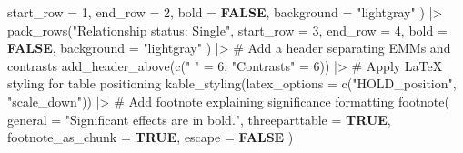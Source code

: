 \documentclass[
  bookmarksnumbered]{article}
\newenvironment{Shaded}{\begin{snugshade}}{\end{snugshade}}
\newcommand{\AttributeTok}[1]{\textcolor[rgb]{0.80,0.80,0.80}{#1}}
\newcommand{\CommentTok}[1]{\textcolor[rgb]{0.50,0.62,0.50}{#1}}
\newcommand{\ConstantTok}[1]{\textcolor[rgb]{0.86,0.64,0.64}{\textbf{#1}}}
\newcommand{\DecValTok}[1]{\textcolor[rgb]{0.86,0.86,0.80}{#1}}
\newcommand{\FunctionTok}[1]{\textcolor[rgb]{0.94,0.94,0.56}{#1}}
\newcommand{\NormalTok}[1]{\textcolor[rgb]{0.80,0.80,0.80}{#1}}
\newcommand{\OtherTok}[1]{\textcolor[rgb]{0.94,0.94,0.56}{#1}}
\newcommand{\SpecialCharTok}[1]{\textcolor[rgb]{0.86,0.64,0.64}{#1}}
\newcommand{\StringTok}[1]{\textcolor[rgb]{0.80,0.58,0.58}{#1}}
\begin{document}
\begin{Shaded}
\begin{Highlighting}[]
    \AttributeTok{start\_row =} \DecValTok{1}\NormalTok{, }\AttributeTok{end\_row =} \DecValTok{2}\NormalTok{,}
    \AttributeTok{bold =} \ConstantTok{FALSE}\NormalTok{, }\AttributeTok{background =} \StringTok{"lightgray"}
\NormalTok{  ) }\SpecialCharTok{|\textgreater{}}
  \FunctionTok{pack\_rows}\NormalTok{(}\StringTok{"Relationship status: Single"}\NormalTok{,}
    \AttributeTok{start\_row =} \DecValTok{3}\NormalTok{, }\AttributeTok{end\_row =} \DecValTok{4}\NormalTok{,}
    \AttributeTok{bold =} \ConstantTok{FALSE}\NormalTok{, }\AttributeTok{background =} \StringTok{"lightgray"}
\NormalTok{  ) }\SpecialCharTok{|\textgreater{}}
  \CommentTok{\# Add a header separating EMMs and contrasts}
  \FunctionTok{add\_header\_above}\NormalTok{(}\FunctionTok{c}\NormalTok{(}\StringTok{" "} \OtherTok{=} \DecValTok{6}\NormalTok{, }\StringTok{"Contrasts"} \OtherTok{=} \DecValTok{6}\NormalTok{)) }\SpecialCharTok{|\textgreater{}}
  \CommentTok{\# Apply LaTeX styling for table positioning}
  \FunctionTok{kable\_styling}\NormalTok{(}\AttributeTok{latex\_options =} \FunctionTok{c}\NormalTok{(}\StringTok{"HOLD\_position"}\NormalTok{, }\StringTok{"scale\_down"}\NormalTok{)) }\SpecialCharTok{|\textgreater{}}
  \CommentTok{\# Add footnote explaining significance formatting}
  \FunctionTok{footnote}\NormalTok{(}
    \AttributeTok{general =} \StringTok{"Significant effects are in bold."}\NormalTok{, }\AttributeTok{threeparttable =} \ConstantTok{TRUE}\NormalTok{,}
    \AttributeTok{footnote\_as\_chunk =} \ConstantTok{TRUE}\NormalTok{, }\AttributeTok{escape =} \ConstantTok{FALSE}
\NormalTok{  )}
\end{Highlighting}
\end{Shaded}
\end{document}

